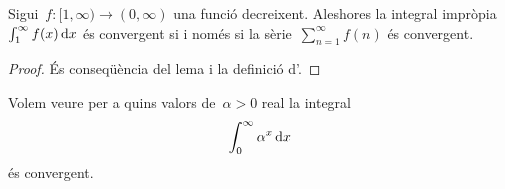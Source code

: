 \documentclass[../../main.tex]{subfiles}
\begin{document}
    \begin{theorem}
        \label{thm:criteri de la integral per integrals impròpies}
        Sigui~\(f\colon[1,\infty)\longrightarrow(0,\infty)\) una funció decreixent.
        Aleshores la integral impròpia~\(\int_{1}^{\infty}f(x)\mathop{}\!\mathrm{d} x\) és convergent si i només si la sèrie~\(\sum_{n=1}^{\infty}f(n)\) és convergent.
        \begin{proof}
            És conseqüència del lema  i la definició d'.
        \end{proof}
    \end{theorem}
    \begin{example}
        \label{ex:criteri de la integral per integrals impròpies}
        Volem veure per a quins valors de~\(\alpha>0\) real la integral
        \begin{equation}
            \label{ex:criteri de la integral per integrals impròpies:eq1}
            \int_{0}^{\infty}\alpha^{x}\mathop{}\!\mathrm{d} x
        \end{equation}
        és convergent.
        \begin{solution}
        \end{solution}
    \end{example}
\end{document}
